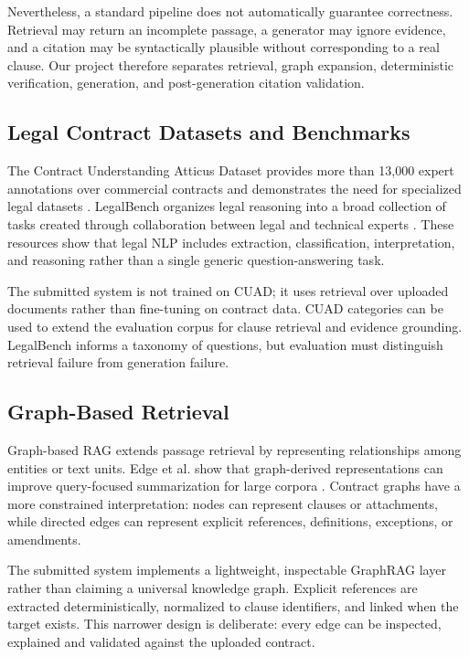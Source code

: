 \documentclass[12pt,a4paper,oneside]{report}
\begin{document}
Nevertheless, a standard pipeline does not automatically guarantee correctness. Retrieval may return an incomplete passage, a generator may ignore evidence, and a citation may be syntactically plausible without corresponding to a real clause. Our project therefore separates retrieval, graph expansion, deterministic verification, generation, and post-generation citation validation.

\subsection{Legal Contract Datasets and Benchmarks}
The Contract Understanding Atticus Dataset provides more than 13,000 expert annotations over commercial contracts and demonstrates the need for specialized legal datasets \cite{hendrycks2021cuad}. LegalBench organizes legal reasoning into a broad collection of tasks created through collaboration between legal and technical experts \cite{guha2023legalbench}. These resources show that legal NLP includes extraction, classification, interpretation, and reasoning rather than a single generic question-answering task.

The submitted system is not trained on CUAD; it uses retrieval over uploaded documents rather than fine-tuning on contract data. CUAD categories can be used to extend the evaluation corpus for clause retrieval and evidence grounding. LegalBench informs a taxonomy of questions, but evaluation must distinguish retrieval failure from generation failure.

\subsection{Graph-Based Retrieval}
Graph-based RAG extends passage retrieval by representing relationships among entities or text units. Edge et al. show that graph-derived representations can improve query-focused summarization for large corpora \cite{edge2024graphrag}. Contract graphs have a more constrained interpretation: nodes can represent clauses or attachments, while directed edges can represent explicit references, definitions, exceptions, or amendments.

The submitted system implements a lightweight, inspectable GraphRAG layer rather than claiming a universal knowledge graph. Explicit references are extracted deterministically, normalized to clause identifiers, and linked when the target exists. This narrower design is deliberate: every edge can be inspected, explained and validated against the uploaded contract.
\end{document}
